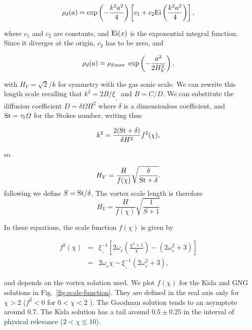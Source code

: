 \documentclass[apj]{emulateapj}
\newcommand{\Fig}[1]{Fig.~\ref{#1}}
\newcommand{\fig}[1]{\Fig{#1}}
\newcommand{\beq}{\begin{equation}}
\newcommand{\eeq}{\end{equation}}
\newcommand{\beqn}{\begin{eqnarray}}
\newcommand{\eeqn}{\end{eqnarray}}
\newcommand{\epsp}{\xi_{_{+}}}
\newcommand{\tauf}{\tau_{\rm f}}
\newcommand{\St}{{\rm St}}
\begin{document}
\beq
\rho_d(a) = \exp\left(-\frac{k^2a^2}{4}\right)  \left[c_1 + c_2 {\rm
    Ei}\left(\frac{k^2a^2}{4}\right)\right],
\eeq

\noindent where $c_1$ and $c_2$ are constants, and ${\rm Ei}(x)$ is
the exponential integral function. Since it diverges at the origin, $c_2$ has to be zero, and 

\beq
\rho_d(a) = \rho_{d\,{\rm max}} \ \exp\left(-\frac{a^2}{2H_V^2}\right),
\label{eq:gen_axi}
\eeq

\noindent with $H_V = \sqrt{2}/k$ for symmetry with the gas sonic scale. We can 
rewrite this length scale recalling that $k^2=2B/\epsp$ and
$B=C/D$. We can substitute the diffusion coefficient $D=\delta \varOmega H^2$ where 
$\delta$ is a dimensionless coefficient, and $\St = \tauf\varOmega$ for 
the Stokes number, writing thus 

\beqn
\label{eq:k}
k^2 = \frac{2(\St+\delta)}{\delta H^2} f^2(\chi),
\eeqn 

\noindent so

\beq
 H_V = \frac{H}{f(\chi)} \sqrt{\frac{\delta}{\St+\delta}}. 
\label{eq:hv-pre}
\eeq
\noindent following \cite{Jacquet12} we define $S=\St/\delta$. The vortex scale
length is therefore
\beq
H_V = \frac{H}{f(\chi)} \sqrt{\frac{1}{S+1}}
\label{eq:hv}
\eeq

\noindent In these equations, the scale function $f(\chi)$ is given by 

\beqn
f^2(\chi) &=& \epsp^{-1} \left[2\omega_{_V}\left(\frac{\chi^2+1}{\chi}\right) - (2\omega_{_V}^2 + 3) \right]\nonumber \\
          &=& 2\omega_{_V}\chi - \epsp^{-1}(2\omega_{_V}^2 + 3),
\label{eq:scale-function}
\eeqn

\noindent and depends on the vortex solution
used. We plot $f(\chi)$ for the Kida and GNG solutions in
\fig{fig:scale-function}. They are defined in the real axis only for $\chi > 2$ ($f^2
< 0$ for $0 < \chi < 2$ ). The Goodman solution tends to an asymptote
around 0.7. The Kida solution has a  tail around $0.5\pm0.25$ in the
interval of physical relevance ($2 < \chi \lesssim 10$). %
\end{document}
